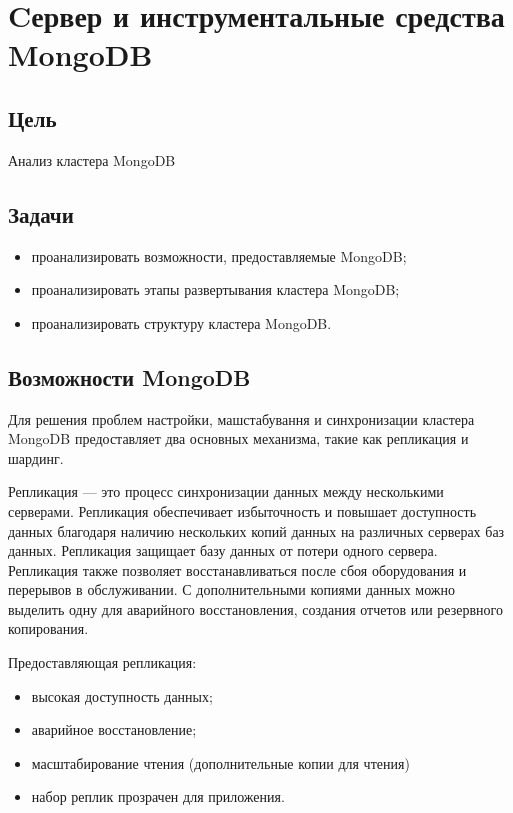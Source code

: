 



\newcommand{\labnumber}{5} %



\usepackage{longtable,tabu}

\graphicspath{{figures/}}


\Ukrainian


\addtocounter{page}{1}

\section{Cервер и инструментальные средства MongoDB}
\subsection*{Цель}
Анализ кластера MongoDB
\subsection*{Задачи}
\begin{itemize}
	\item проанализировать возможности, предоставляемые MongoDB;
	\item проанализировать этапы развертывания кластера MongoDB;
	\item проанализировать структуру кластера MongoDB.
\end{itemize}

\subsection{Возможности MongoDB}
Для решения проблем настройки, машстабування и синхронизации кластера MongoDB предоставляет два основных механизма, такие как репликация и шардинг.

Репликация --- это процесс синхронизации данных между несколькими серверами. Репликация обеспечивает избыточность и повышает доступность данных благодаря наличию нескольких копий данных на различных серверах баз данных. Репликация защищает базу данных от потери одного сервера. Репликация также позволяет восстанавливаться после сбоя оборудования и перерывов в обслуживании. С дополнительными копиями данных можно выделить одну для аварийного восстановления, создания отчетов или резервного копирования.

Предоставляющая репликация:
\begin{itemize}
	\item высокая доступность данных;
	\item аварийное восстановление;
	\item масштабирование чтения (дополнительные копии для чтения)
	\item набор реплик прозрачен для приложения.
\end{itemize}

